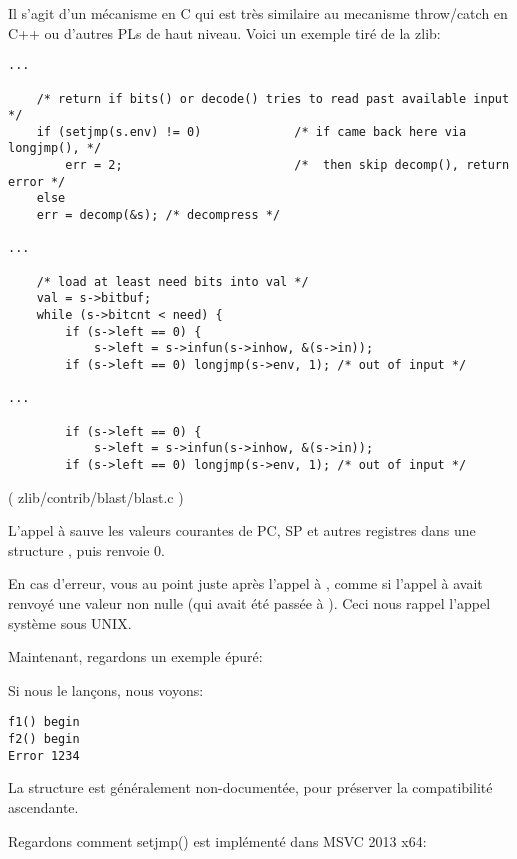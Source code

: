 

Il s'agit d'un mécanisme en C qui est très similaire au mecanisme throw/catch en
C++ ou d'autres \ac{PL}s de haut niveau.
Voici un exemple tiré de la zlib:

\begin{lstlisting}[style=customc]
...

    /* return if bits() or decode() tries to read past available input */
    if (setjmp(s.env) != 0)             /* if came back here via longjmp(), */
        err = 2;                        /*  then skip decomp(), return error */
    else
	err = decomp(&s); /* decompress */

...

    /* load at least need bits into val */
    val = s->bitbuf;
    while (s->bitcnt < need) {
        if (s->left == 0) {
            s->left = s->infun(s->inhow, &(s->in));
	    if (s->left == 0) longjmp(s->env, 1); /* out of input */

...

        if (s->left == 0) {
            s->left = s->infun(s->inhow, &(s->in));
	    if (s->left == 0) longjmp(s->env, 1); /* out of input */
\end{lstlisting}
( zlib/contrib/blast/blast.c )

L'appel à  sauve les valeurs courantes de \ac{PC}, \ac{SP} et autres
registres dans une structure , puis renvoie 0.

En cas d'erreur,  vous  au point juste après l'appel
à , comme si l'appel à  avait renvoyé une valeur non nulle
(qui avait été passée à ).
Ceci nous rappel l'appel système  sous UNIX.

Maintenant, regardons un exemple épuré:



Si nous le lançons, nous voyons:

\begin{lstlisting}
f1() begin
f2() begin
Error 1234
\end{lstlisting}

La structure  est généralement non-documentée, pour préserver la compatibilité
ascendante.

Regardons comment setjmp() est implémenté dans MSVC 2013 x64:

